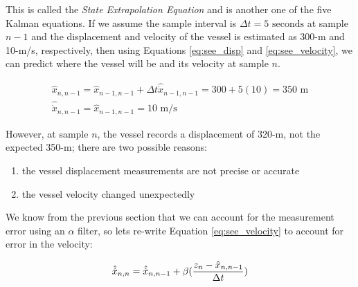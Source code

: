         This is called the \textit{State Extrapolation Equation}  and is another one of the five Kalman equations.
        If we assume the sample interval is $\Delta t = 5 \text{ seconds}$ at sample $n-1$ and the displacement and velocity of the vessel is estimated as 300-m and 10-m/s, respectively, then using Equations \ref{eq:see_disp} and \ref{eq:see_velocity}, we can predict where the vessel will be and its velocity at sample $n$.
        
        \begin{equation*}
            \begin{gathered}
                \hat{x}_{n,n-1} = \hat{x}_{n-1,n-1} + \Delta t \hat{\dot{x}}_{n-1,n-1} = 300 + 5(10) = 350 \text{ m} \\
                \hat{\dot{x}}_{n,n-1} = \hat{x}_{n-1,n-1} = 10 \text{ m/s}
            \end{gathered}
        \end{equation*}

        However, at sample $n$, the vessel records a displacement of 320-m, not the expected 350-m; there are two possible reasons:

        \begin{enumerate}
            \item the vessel displacement measurements are not precise or accurate
            \item the vessel velocity changed unexpectedly 
        \end{enumerate}

        We know from the previous section that we can account for the measurement error using an $\alpha$ filter, so lets re-write Equation \ref{eq:see_velocity} to account for error in the velocity:

        \begin{equation}
            \labeq{see_velocity_b}
            \hat{\dot{x}}_{n,n} = \hat{\dot{x}}_{n,n-1} + \beta(\frac{z_n - \hat{x}_{n,n-1}}{\Delta t})
        \end{equation}


